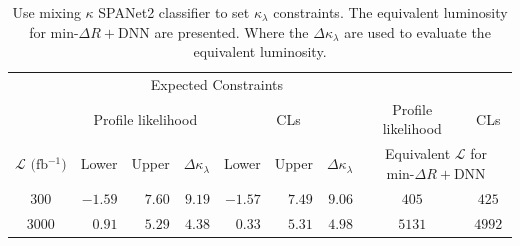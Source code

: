 \documentclass[12pt]{article}
\begin{document}
	\begin{table}[htpb]
		\centering
		\caption{Use mixing $\kappa$ SPANet2 classifier to set $\kappa_\lambda$ constraints. The equivalent luminosity for $\text{min-}\Delta R + \text{DNN}$ are presented. Where the $\Delta \kappa_\lambda$ are used to evaluate the equivalent luminosity.}
		\label{tab:kappa_constraint_equivalent_luminosity}
		\begin{tabular}{c|rrr|rrr|c|c}
		     & \multicolumn{6}{c|}{Expected Constraints}                           &                    &       \\
			 & \multicolumn{3}{c|}{Profile likelihood} & \multicolumn{3}{c|}{CLs}  & Profile likelihood & CLs   \\ \hline
		$\mathcal{L}\text{ (fb$^{-1}$)}$ & Lower   & Upper  & $\Delta\kappa_\lambda$ & Lower   & Upper  & $\Delta\kappa_\lambda$ & \multicolumn{2}{c}{Equivalent $\mathcal{L}$ for $\text{min-}\Delta R + \text{DNN}$} \\ \hline
		300  & $-1.59$ & $7.60$ & $9.19$ & $-1.57$ & $7.49$ & $9.06$ & $405$  & $425$  \\
		3000 & $0.91$  & $5.29$ & $4.38$ & $0.33$  & $5.31$ & $4.98$ & $5131$ & $4992$ \\
		\end{tabular}
	\end{table}
\end{document}
